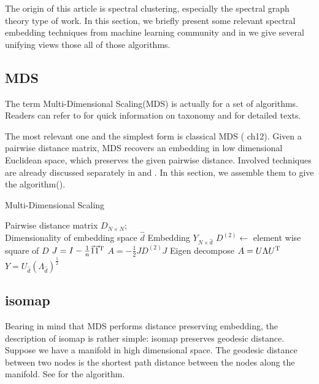 The origin of this article is spectral clustering, 
especially the spectral graph theory type of work. 
In this section, we 
briefly present some relevant spectral embedding techniques 
from machine learning community and in 
\rsec{\ref{sec:unify}} we give several unifying views
those all of those algorithms. 

\subsection{MDS}
\label{sec:mds}

The term Multi-Dimensional Scaling(MDS) 
\cite{cox2008mds} is actually for a set of algorithms. 
Readers can refer to \cite{wiki_mds} for quick information
on taxonomy and 
\cite{borg2005modern} for detailed texts. 

The most relevant one and the simplest form is classical MDS
(\cite{borg2005modern} ch12). Given a pairwise distance matrix, 
MDS recovers an embedding in low dimensional Euclidean space, 
which preserves the given pairwise distance. 
Involved techniques are already discussed separately in 
\rsec{\ref{sec:proximity}} and \rsec{\ref{sec:lrapprox}}. In 
this section, we assemble them to give the algorithm(\ralg{\ref{alg:mds}}). 

\begin{algorithm}[htb]
	\caption{Multi-Dimensional Scaling}
	\label{alg:mds}
	\begin{algorithmic}[1]
		\REQUIRE Pairwise distance matrix $ D_{N \times N} $; \\
			Dimensionality of embedding space $ \hat{d} $
		\ENSURE Embedding $ Y_{N \times \hat{d}} $
		\STATE $ D^{(2)} \leftarrow$ element wise square of $ D $
		\STATE $ J = I - \frac{1}{n} \vec{1} \vec{1}^\mathrm{T} $
		\STATE $ A = -\frac{1}{2}JD^{(2)}J $
		\STATE Eigen decompose $ A = U \Lambda U^\mathrm{T} $
		\STATE $ Y = U_{\hat{d}} (\Lambda_{\hat{d}})^{\frac{1}{2}} $
	\end{algorithmic}
\end{algorithm}

\subsection{isomap}
\label{sec:isomap}

Bearing in mind that MDS performs distance preserving 
embedding, the description of isomap \cite{tenenbaum2000isomap}
is rather simple: isomap preserves geodesic distance. 
Suppose we have a manifold in high dimensional space. 
The geodesic distance between two nodes 
is the shortest path distance between the nodes 
along the manifold. 
See \ralg{\ref{alg:isomap}} for the algorithm. 

